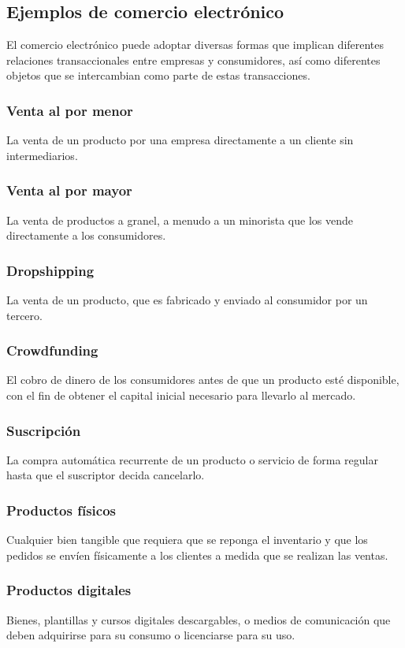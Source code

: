\documentclass[12pt,letterpaper]{article}
\begin{document}
\subsection{Ejemplos de comercio electrónico}
El comercio electrónico puede adoptar diversas formas que implican diferentes relaciones 
transaccionales entre empresas y consumidores, así como diferentes objetos que se intercambian como parte de estas transacciones.

\subsubsection{Venta al por menor}
La venta de un producto por una empresa directamente a un cliente sin intermediarios.

\subsubsection{Venta al por mayor}
La venta de productos a granel, a menudo a un minorista que los vende directamente a los 
consumidores.

\subsubsection{Dropshipping}
La venta de un producto, que es fabricado y enviado al consumidor por un tercero.

\subsubsection{Crowdfunding}
El cobro de dinero de los consumidores antes de que un producto esté disponible, con el fin 
de obtener el capital inicial necesario para llevarlo al mercado.

\subsubsection{Suscripción}
La compra automática recurrente de un producto o servicio de forma regular hasta que el 
suscriptor decida cancelarlo. 

\subsubsection{Productos físicos}
Cualquier bien tangible que requiera que se reponga el inventario y que los pedidos se 
envíen físicamente a los clientes a medida que se realizan las ventas.

\subsubsection{Productos digitales}
Bienes, plantillas y cursos digitales descargables, o medios de comunicación que deben 
adquirirse para su consumo o licenciarse para su uso. 
\end{document}
